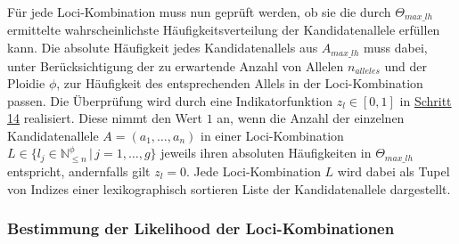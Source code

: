 Für jede Loci-Kombination muss nun geprüft werden, ob sie die durch $\Theta_{max\_lh}$ ermittelte wahrscheinlichste Häufigkeitsverteilung der Kandidatenallele erfüllen kann. Die absolute Häufigkeit jedes Kandidatenallels aus $A_{max\_lh}$ muss dabei, unter Berücksichtigung der zu erwartende Anzahl von Allelen $n_{alleles}$ und der Ploidie $\phi$, zur Häufigkeit des entsprechenden Allels in der Loci-Kombination passen. Die Überprüfung wird durch eine Indikatorfunktion $ z_{l} \in {[0,1]} $ in \hyperref[step14]{Schritt 14\label{step14txt}} realisiert. Diese nimmt den Wert $1$ an, wenn die Anzahl der einzelnen Kandidatenallele $A = (a_{1}, \dots, a_{n})$ in einer Loci-Kombination $L \in \{l_{j} \in \mathds{N}_{\leq n}^\phi \, | \, j=1, \dots, g\}$ jeweils ihren absoluten Häufigkeiten in $\Theta_{max\_lh}$ entspricht, andernfalls gilt $ z_{l} = 0 $. Jede Loci-Kombination $L$ wird dabei als Tupel von Indizes einer lexikographisch sortieren Liste der Kandidatenallele dargestellt.
\vspace{-0.5cm}
\begin{center}
\end{center}

\subsubsection{Bestimmung der Likelihood der Loci-Kombinationen} \label{sol_loci_lh_max}


